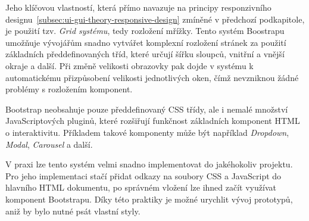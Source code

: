 Jeho klíčovou vlastností, která přímo navazuje na principy responzivního designu~\ref{subsec:ui-gui-theory-responsive-design} zmíněné v předchozí podkapitole, je použití tzv. \textit{Grid systému}, tedy rozložení mřížky. Tento systém Boostrapu umožňuje vývojářům snadno vytvářet komplexní rozložení stránek za použití základních předdefinovaných tříd, které určují šířku sloupců, vnitřní a vnější okraje a další. Při změně velikosti obrazovky pak dojde v systému k automatickému přizpůsobení velikosti jednotlivých oken, čímž nevzniknou žádné problémy s rozložením komponent.

Bootstrap neobsahuje pouze předdefinovaný CSS třídy, ale i nemalé množství JavaScriptových pluginů, které rozšiřují funkčnost základních komponent HTML o interaktivitu. Příkladem takové komponenty může být například \textit{Dropdown}, \textit{Modal}, \textit{Carousel} a další.

V praxi lze tento systém velmi snadno implementovat do jakéhokoliv projektu. Pro jeho implementaci stačí přidat odkazy na soubory CSS a JavaScript do hlavního HTML dokumentu, po správném vložení lze ihned začít využívat komponent Bootstrapu. Díky této praktiky je možné urychlit vývoj prototypů, aniž by bylo nutné psát vlastní styly.

\endinput
